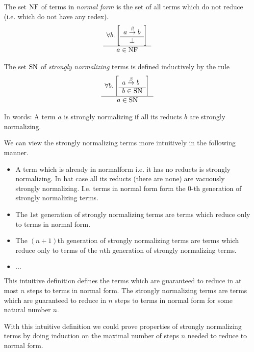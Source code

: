 \begin{definition}
    The set $\text{NF}$ of terms in \emph{normal form} is the set of all terms which
    do not reduce (i.e. which do not have any redex).
    $$
    \begin{array}{c} 
        \forall b. \left[ \begin{array}{c} a \stackrel{\beta}{\to} b \\ \hline \perp\end{array} \right]
     \\ \hline 
        a \in \text{NF}
    \end{array}
    $$
\end{definition}



\begin{definition}
    The set $\text{SN}$ of \emph{strongly normalizing} terms is defined inductively
    by the rule
    $$
        \begin{array}{c} 
            \forall b. \left[ \begin{array}{l} a \stackrel{\beta}{\to} b \\ \hline b \in \text{SN}\end{array} \right]
         \\ \hline 
            a \in \text{SN}
        \end{array}
    $$
\end{definition}

In words: A term $a$ is strongly normalizing if all its reducts $b$ are strongly
normalizing.

We can view the strongly normalizing terms more intuitively in the following
manner.

\begin{itemize}

    \item A term which is already in normalform i.e. it has no reducts is
        strongly normalizing. In hat case all its reducts (there are none) are
        vacuously strongly normalizing. I.e. terms in normal form form the
        $0$-th generation of strongly normalizing terms.

    \item The $1$st generation of strongly normalizing terms are terms which
        reduce only to terms in normal form.

    \item The $(n+1)$th generation of strongly normalizing terms are terms which
        reduce only to terms of the $n$th generation of strongly normalizing
        terms.

    \item $\ldots$

\end{itemize}

This intuitive definition defines the terms which are guaranteed to reduce in at
most $n$ steps to terms in normal form. The strongly normalizing terms are terms
which are guaranteed to reduce in $n$ steps to terms in normal form for some
natural number $n$.

With this intuitive definition we could prove properties of strongly normalizing
terms by doing induction on the maximal number of steps $n$ needed to reduce to
normal form.


